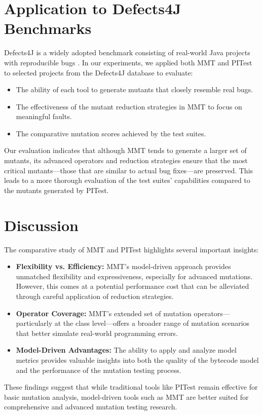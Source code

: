 \documentclass[sigplan, nonacm]{acmart}
\begin{document}
\section{Application to Defects4J Benchmarks}
\label{sec:defects4j}
Defects4J is a widely adopted benchmark consisting of real-world Java projects with reproducible bugs \cite{Defects4J}. In our experiments, we applied both MMT and PITest to selected projects from the Defects4J database to evaluate:
\begin{itemize}[noitemsep]
    \item The ability of each tool to generate mutants that closely resemble real bugs.
    \item The effectiveness of the mutant reduction strategies in MMT to focus on meaningful faults.
    \item The comparative mutation scores achieved by the test suites.
\end{itemize}
Our evaluation indicates that although MMT tends to generate a larger set of mutants, its advanced operators and reduction strategies ensure that the most critical mutants—those that are similar to actual bug fixes—are preserved. This leads to a more thorough evaluation of the test suites' capabilities compared to the mutants generated by PITest.

\section{Discussion}
The comparative study of MMT and PITest highlights several important insights:
\begin{itemize}[noitemsep]
    \item \textbf{Flexibility vs. Efficiency:} MMT’s model-driven approach provides unmatched flexibility and expressiveness, especially for advanced mutations. However, this comes at a potential performance cost that can be alleviated through careful application of reduction strategies.
    \item \textbf{Operator Coverage:} MMT’s extended set of mutation operators—particularly at the class level—offers a broader range of mutation scenarios that better simulate real-world programming errors.
    \item \textbf{Model-Driven Advantages:} The ability to apply and analyze model metrics provides valuable insights into both the quality of the bytecode model and the performance of the mutation testing process.
\end{itemize}
These findings suggest that while traditional tools like PITest remain effective for basic mutation analysis, model-driven tools such as MMT are better suited for comprehensive and advanced mutation testing research.
\end{document}
